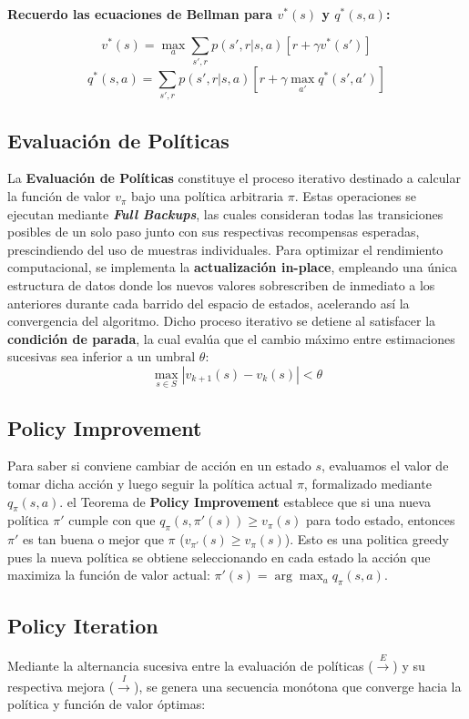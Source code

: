 \documentclass[11pt,a4paper]{article}
\begin{document}
\noindent\textbf{Recuerdo las ecuaciones de Bellman para $v^*(s)$ y $q^*(s, a)$:}

    \[ v^*(s) = \max_a \sum_{s', r} p(s', r \vert s, a) \left[ r + \gamma v^*(s') \right] \]
    \[ q^*(s, a) = \sum_{s', r} p(s', r \vert s, a) \left[ r + \gamma \max_{a'} q^*(s', a') \right] \]

\subsection*{Evaluación de Políticas}
La \textbf{Evaluación de Políticas} constituye el proceso iterativo destinado a calcular la función de valor $v_\pi$ bajo una política arbitraria $\pi$. Estas operaciones se ejecutan mediante \textbf{\textit{Full Backups}}, las cuales consideran todas las transiciones posibles de un solo paso junto con sus respectivas recompensas esperadas, prescindiendo del uso de muestras individuales. Para optimizar el rendimiento computacional, se implementa la \textbf{actualización in-place}, empleando una única estructura de datos donde los nuevos valores sobrescriben de inmediato a los anteriores durante cada barrido del espacio de estados, acelerando así la convergencia del algoritmo. Dicho proceso iterativo se detiene al satisfacer la \textbf{condición de parada}, la cual evalúa que el cambio máximo entre estimaciones sucesivas sea inferior a un umbral $\theta$:
\[ \max_{s \in S} |v_{k+1}(s) - v_k(s)| < \theta \]
    
\subsection*{Policy Improvement}
Para saber si conviene cambiar de acción en un estado $s$, evaluamos el valor de tomar dicha acción y luego seguir la política actual $\pi$, formalizado mediante $q_\pi(s, a)$. el Teorema de \textbf{Policy Improvement} establece que si una nueva política $\pi'$ cumple con que $q_\pi(s, \pi'(s)) \ge v_\pi(s)$ para todo estado, entonces $\pi'$ es tan buena o mejor que $\pi$ ($v_{\pi'}(s) \ge v_\pi(s)$). Esto es una politica greedy pues la nueva política se obtiene seleccionando en cada estado la acción que maximiza la función de valor actual: $\pi'(s) = \arg\max_a q_\pi(s, a)$.


\subsection*{Policy Iteration}
Mediante la alternancia sucesiva entre la evaluación de políticas ($\xrightarrow{E}$) y su respectiva mejora ($\xrightarrow{I}$), se genera una secuencia monótona que converge hacia la política y función de valor óptimas:
\end{document}
